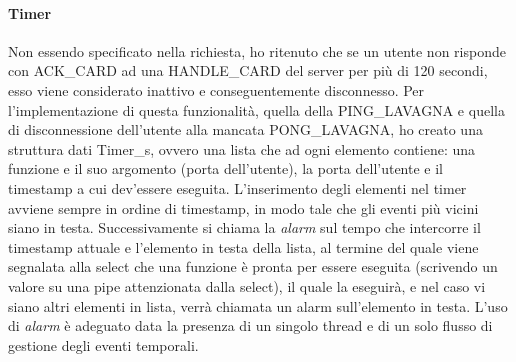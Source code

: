 \documentclass[11pt,a4paper,twocolumn,twoside]{paper}
\begin{document}
\paragraph{Timer}
    Non essendo specificato nella richiesta, ho ritenuto che se un utente non risponde con ACK\_CARD ad una HANDLE\_CARD del server per più di 120 secondi, esso viene considerato inattivo e conseguentemente disconnesso. Per l'implementazione di questa funzionalità, quella della PING\_LAVAGNA e quella di disconnessione dell'utente alla mancata PONG\_LAVAGNA, ho creato una struttura dati Timer\_s, ovvero una lista che ad ogni elemento contiene: una funzione e il suo argomento (porta dell'utente), la porta dell'utente e il timestamp a cui dev'essere eseguita. L'inserimento degli elementi nel timer avviene sempre in ordine di timestamp, in modo tale che gli eventi più vicini siano in testa. Successivamente si chiama la \textit{alarm} sul tempo che intercorre il timestamp attuale e l'elemento in testa della lista, al termine del quale viene segnalata alla select che una funzione è pronta per essere eseguita (scrivendo un valore su una pipe attenzionata dalla select), il quale la eseguirà, e nel caso vi siano altri elementi in lista, verrà chiamata un alarm sull'elemento in testa. L’uso di \textit{alarm} è adeguato data la presenza di un singolo thread e di un solo flusso di gestione degli eventi temporali.
\end{document}
